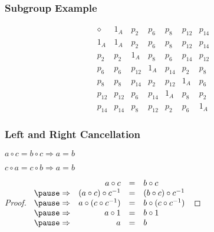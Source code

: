 \documentclass[dvipsnames]{beamer}
\begin{document}
\begin{frame}
  \frametitle{Subgroup Example}

  \begin{example}
    \[
      \begin{array}{c||c|c|c|c|c|c}
        \diamond & 1_{A}  & p_{2}  & p_{6}  & p_{8}  & p_{12} & p_{14}\\\hline\hline
        1_{A}    & 1_{A}  & p_{2}  & p_{6}  & p_{8}  & p_{12} & p_{14}\\\hline
        p_{2}    & p_{2}  & 1_{A}  & p_{8}  & p_{6}  & p_{14} & p_{12}\\\hline
        p_{6}    & p_{6}  & p_{12} & 1_{A}  & p_{14} & p_{2}  & p_{8}\\\hline
        p_{8}    & p_{8}  & p_{14} & p_{2}  & p_{12} & 1_{A}  & p_{6}\\\hline
        p_{12}   & p_{12} & p_{6}  & p_{14} & 1_{A}  & p_{8}  & p_{2}\\\hline
        p_{14}   & p_{14} & p_{8}  & p_{12} & p_{2}  & p_{6}  & 1_{A}
      \end{array}
    \]
  \end{example}
\end{frame}

\begin{frame}
  \frametitle{Left and Right Cancellation}

  \begin{theorem}
    $a \circ c = b \circ c \Rightarrow a = b$

    $c \circ a = c \circ b \Rightarrow a = b$
  \end{theorem}

  \pause
  \begin{proof}
    $\begin{array}{crcl}
                  & a \circ c                & = & b \circ c\\ \pause
      \Rightarrow & (a \circ c) \circ c^{-1} & = & (b \circ c) \circ c^{-1}\\ \pause
      \Rightarrow & a \circ (c \circ c^{-1}) & = & b \circ (c \circ c^{-1})\\ \pause
      \Rightarrow & a \circ 1                & = & b \circ 1\\ \pause
      \Rightarrow & a                        & = & b
    \end{array}$

  \end{proof}
\end{frame}
\end{document}

